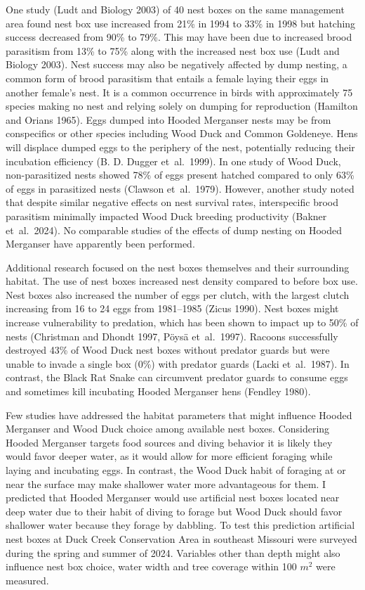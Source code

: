 One study (Ludt and Biology 2003) of 40 nest boxes on the same management area found nest box use increased from 21\% in 1994 to 33\% in 1998 but hatching success decreased from 90\% to 79\%. This may have been due to increased brood parasitism from 13\% to 75\% along with the increased nest box use (Ludt and Biology 2003). Nest success may also be negatively affected by dump nesting, a common form of brood parasitism that entails a female laying their eggs in another female’s nest. It is a common occurrence in birds with approximately 75 species making no nest and relying solely on dumping for reproduction (Hamilton and Orians 1965). Eggs dumped into Hooded Merganser nests may be from conspecifics or other species including Wood Duck and Common Goldeneye. Hens will displace dumped eggs to the periphery of the nest, potentially reducing their incubation efficiency (B. D. Dugger et~al.~1999).  In one study of Wood Duck, non-parasitized nests showed 78\% of eggs present hatched compared to only 63\% of eggs in parasitized nests (Clawson et~al.~1979). However, another study noted that despite similar negative effects on nest survival rates, interspecific brood parasitism minimally impacted Wood Duck breeding productivity (Bakner et~al.~2024). No comparable studies of the effects of dump nesting on Hooded Merganser have apparently been performed.

Additional research focused on the nest boxes themselves and their surrounding habitat. The use of nest boxes increased nest density compared to before box use. Nest boxes also increased the number of eggs per clutch, with the largest clutch increasing from 16 to 24 eggs from 1981–1985 (Zicus 1990).  Nest boxes might increase vulnerability to predation, which has been shown to impact up to 50\% of nests (Christman and Dhondt 1997, Pöysä et~al.~1997). Racoons successfully destroyed 43\% of Wood Duck nest boxes without predator guards but were unable to invade a single box (0\%) with predator guards (Lacki et~al.~1987). In contrast, the Black Rat Snake can circumvent predator guards to consume eggs and sometimes kill incubating Hooded Merganser hens (Fendley 1980).  


Few studies have addressed the habitat parameters that might influence Hooded Merganser and Wood Duck choice among available nest boxes.  Considering  Hooded Merganser targets food sources and diving behavior it is likely they would favor deeper water, as it would allow for more efficient foraging while laying and incubating eggs. In contrast, the Wood Duck habit of foraging at or near the surface may make shallower water more advantageous for them. I predicted that Hooded Merganser would use artificial nest boxes located near deep water due to their habit of diving to forage but Wood Duck should favor shallower water because they forage by dabbling. To test this prediction artificial nest boxes at Duck Creek Conservation Area in southeast Missouri were surveyed during the spring and summer of 2024.  Variables other than depth might also influence nest box choice, water width and tree coverage within 100 $m^2$ were measured. 

